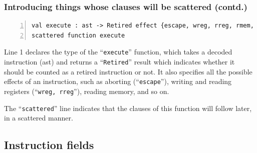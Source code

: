 \documentclass[aspectratio=169]{beamer}
\newcommand{\slidefont}{\scriptsize}
\newcommand{\cf}{\scriptsize\tt}
\begin{document}
\begin{frame}[fragile]
  \frametitle{Introducing things whose clauses will be scattered (contd.)}

  \slidefont

  \begin{Verbatim}[frame=single, numbers=left, label = File riscv\_insts\_begin.sail]
val execute : ast -> Retired effect {escape, wreg, rreg, rmem, ...}
scattered function execute
  \end{Verbatim}

  \begin{minipage}{\textwidth}
    Line 1 declares the type of the ``{\cf execute}'' function, which
    takes a decoded instruction (ast) and returns a ``{\cf Retired}''
    result which indicates whether it should be counted as a retired
    instruction or not.  It also specifies all the possible effects of
    an instruction, such as aborting (``{\cf escape}''), writing and
    reading registers (``{\cf wreg, rreg}''), reading memory, and so on.

    \vspace{1ex}

    The ``{\cf scattered}'' line indicates that the clauses of this
    function will follow later, in a scattered manner.
  \end{minipage}

\end{frame}


\subsection{Instruction fields}

\end{document}
